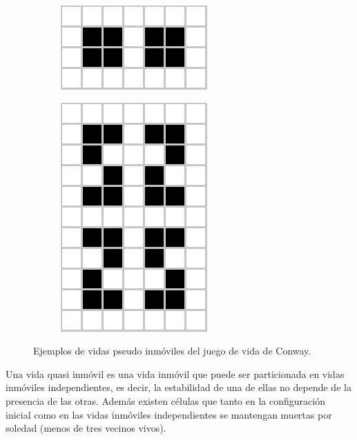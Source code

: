 \documentclass[../proyecto.tex]{memoir}
\begin{document}
\begin{figure}[H]
	\centering
	\begin{subfigure}[b]{0.3\linewidth} 
        \centering
        \includegraphics[height=.35\linewidth]{./images/biblock.png}
        \caption{}
        \label{fig:biblock}
    \end{subfigure}
    \quad
	\begin{subfigure}[b]{0.3\linewidth} 
        \centering
        \includegraphics[height=\linewidth]{./images/bisnake.png}
        \caption{}
        \label{fig:bisnake}
    \end{subfigure}
	\caption{Ejemplos de vidas pseudo inmóviles del juego de vida de Conway.}
	\label{fig:congIniciales2}
\end{figure} 

\begin{defi}
Una vida quasi inmóvil es una vida inmóvil que puede ser particionada en vidas inmóviles independientes, es decir, la estabilidad de una de ellas no depende de la presencia de las otras. Además existen células que tanto en la configuración inicial como en las vidas inmóviles independientes se mantengan muertas por soledad (menos de tres vecinos vivos). 
\end{defi}
\end{document}
